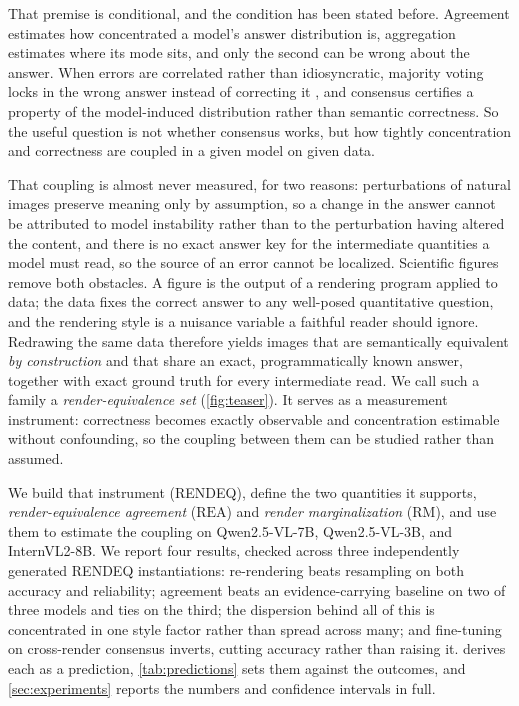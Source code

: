\documentclass[11pt]{article}
\newcommand{\rea}{\mathrm{REA}}
\newcommand{\rmg}{\mathrm{RM}}
\begin{document}
That premise is conditional, and the condition has been stated before. Agreement estimates how concentrated a model's answer distribution is, aggregation estimates where its mode sits, and only the second can be wrong about the answer. When errors are correlated rather than idiosyncratic, majority voting locks in the wrong answer instead of correcting it \citep{estornell2024debate}, and consensus certifies a property of the model-induced distribution rather than semantic correctness. So the useful question is not whether consensus works, but how tightly concentration and correctness are coupled in a given model on given data.

That coupling is almost never measured, for two reasons: perturbations of natural images preserve meaning only by assumption, so a change in the answer cannot be attributed to model instability rather than to the perturbation having altered the content, and there is no exact answer key for the intermediate quantities a model must read, so the source of an error cannot be localized. Scientific figures remove both obstacles. A figure is the output of a rendering program applied to data; the data fixes the correct answer to any well-posed quantitative question, and the rendering style is a nuisance variable a faithful reader should ignore. Redrawing the same data therefore yields images that are semantically equivalent \emph{by construction} and that share an exact, programmatically known answer, together with exact ground truth for every intermediate read. We call such a family a \emph{render-equivalence set} (\cref{fig:teaser}). It serves as a measurement instrument: correctness becomes exactly observable and concentration estimable without confounding, so the coupling between them can be studied rather than assumed.

We build that instrument (RENDEQ), define the two quantities it supports, \emph{render-equivalence agreement} ($\rea$) and \emph{render marginalization} ($\rmg$), and use them to estimate the coupling on Qwen2.5-VL-7B, Qwen2.5-VL-3B, and InternVL2-8B. We report four results, checked across three independently generated RENDEQ instantiations: re-rendering beats resampling on both accuracy and reliability; agreement beats an evidence-carrying baseline on two of three models and ties on the third; the dispersion behind all of this is concentrated in one style factor rather than spread across many; and fine-tuning on cross-render consensus inverts, cutting accuracy rather than raising it.  derives each as a prediction, \cref{tab:predictions} sets them against the outcomes, and \cref{sec:experiments} reports the numbers and confidence intervals in full.
\end{document}
